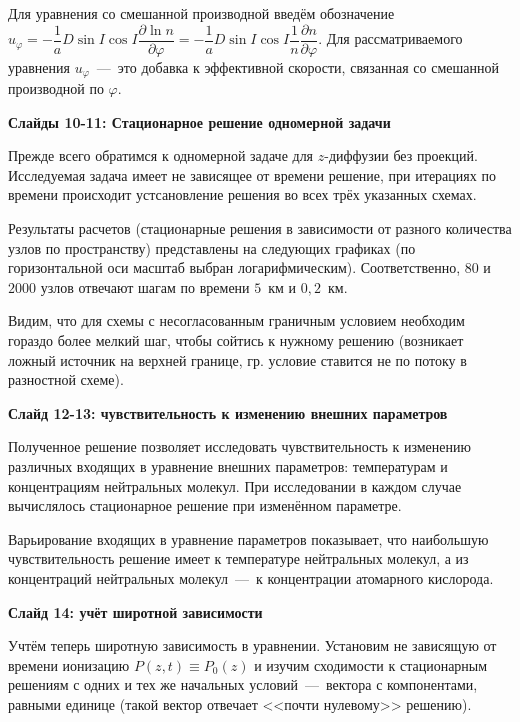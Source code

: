 \documentclass[2pt, a4paper, fleqn]{extarticle}
\begin{document}
\smallskip

Для уравнения со смешанной производной введём обозначение $u_\varphi=-\dfrac{1}{a}D\sin I \cos I\dfrac{\partial \ln n}{\partial \varphi}=-\dfrac{1}{a}D\sin I \cos I\dfrac{1}{n}\dfrac{\partial n}{\partial \varphi}.$ Для рассматриваемого уравнения $u_\varphi$~---~это добавка к эффективной скорости, связанная со смешанной производной по $\varphi$.

\medskip

{\bf Слайды 10-11: Стационарное решение одномерной задачи}

Прежде всего обратимся к одномерной задаче для $z$-диффузии без проекций. Исследуемая задача имеет не зависящее от времени решение, при итерациях по времени происходит устсановление решения во всех трёх указанных схемах. 

Результаты расчетов (стационарные решения в зависимости от разного количества узлов по пространству) представлены на следующих графиках (по горизонтальной оси масштаб выбран логарифмическим). Соответственно, $80$ и $2000$ узлов отвечают шагам по времени $5$~км и $0{,}2$~км.

Видим, что для схемы с несогласованным граничным условием необходим гораздо более мелкий шаг, чтобы сойтись к нужному решению (возникает ложный источник на верхней границе, гр. условие ставится не по потоку в разностной схеме).

\medskip
 
{\bf Слайд 12-13: чувствительность к изменению внешних параметров}

Полученное решение позволяет исследовать чувствительность к изменению различных входящих в уравнение внешних параметров: температурам и концентрациям нейтральных молекул. При исследовании в каждом случае вычислялось стационарное решение при изменённом параметре.

Варьирование входящих в уравнение параметров показывает, что наибольшую чувствительность решение имеет к температуре нейтральных молекул, а из концентраций нейтральных молекул~---~к концентрации атомарного кислорода. 

\medskip

{\bf Слайд 14: учёт широтной зависимости}

Учтём теперь широтную зависимость в уравнении.  Установим не зависящую от времени ионизацию $P(z, t) \equiv P_0(z)$ и изучим сходимости к стационарным решениям с одних и тех же начальных условий~---~вектора с компонентами, равными единице (такой вектор отвечает <<почти нулевому>> решению). 
\end{document}
